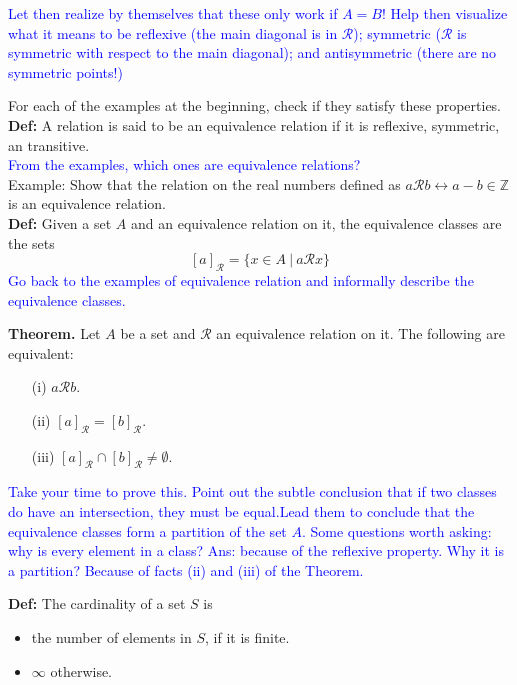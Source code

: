 \documentclass{article}
\begin{document}
\textcolor{blue}{Let then realize by themselves that these only work if $A=B$! Help then visualize what it means to be reflexive (the main diagonal is in $\mathcal{R}$); symmetric ($\mathcal{R}$ is symmetric with respect to the main diagonal); and antisymmetric  (there are no symmetric points!)}

For each of the examples at the beginning, check if they satisfy these properties.\\

{\bf Def:} A relation is said to be an equivalence relation if it is reflexive, symmetric, an transitive.\\

\textcolor{blue}{From the examples, which ones are equivalence relations?}\\

Example: Show that the relation on the real numbers defined as $a\mathcal{R}b \leftrightarrow a-b\in \mathbb{Z}$ is an equivalence relation.\\

{\bf Def:} Given a set $A$ and an equivalence relation on it, the equivalence classes are the sets
\[
[a]_{\mathcal{R}}=\{x\in A~|~a\mathcal{R} x\}
\]
\textcolor{blue}{Go back to the examples of equivalence relation and informally describe the equivalence classes.}

{\bf Theorem.} Let $A$ be a set and $\mathcal{R}$ an equivalence relation on it. The following are equivalent:
\begin{itemize}
    \item[(i)] $a\mathcal{R}b$.
    \item[(ii)] $[a]_{\mathcal{R}}=[b]_{\mathcal{R}}$.
    \item[(iii)] $[a]_{\mathcal{R}}\cap [b]_{\mathcal{R}}\neq \emptyset$.
\end{itemize}

\textcolor{blue}{Take your time to prove this. Point out the subtle conclusion that if two classes do have an intersection, they must be equal.Lead them to conclude that the equivalence classes form a partition of the set $A$. Some questions worth asking: why is every element in a class? Ans: because of the reflexive property. Why it is a partition? Because of facts (ii) and (iii) of the Theorem.}

{\bf Def:} The cardinality of a set $S$ is
\begin{itemize}
    \item the number of elements in $S$, if it is finite.
    \item $\infty$ otherwise.
\end{itemize}
\end{document}
